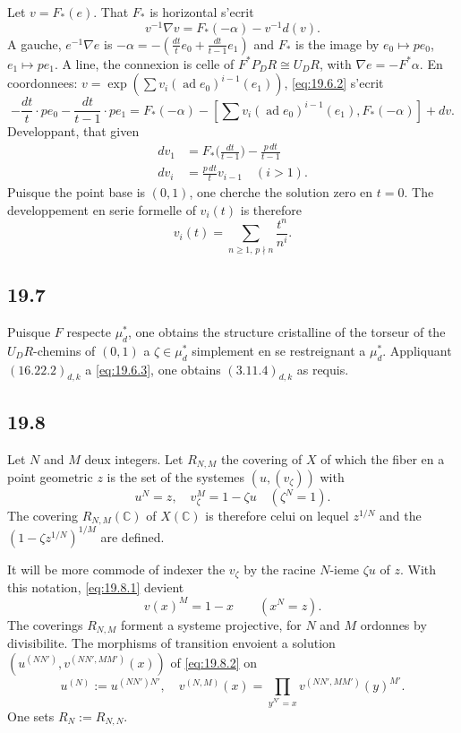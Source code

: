 \documentclass[12pt,a4paper]{article}
\theoremstyle{plain}
\theoremstyle{definition}
\theoremstyle{remark}
\DeclareMathOperator{\ad}{ad}
\newcommand{\dR}{DR}
\newcommand{\CC}{\mathbb{C}}
\begin{document}
Let $v = F_*(e)$. That $F_*$ is horizontal s'ecrit
\begin{equation}\label{eq:19.6.2}
v^{-1} \nabla v = F_*(-\alpha) - v^{-1} d(v).
\end{equation}
A gauche, $e^{-1} \nabla e$ is $-\alpha = -(\frac{dt}{t} e_0 +
\frac{dt}{t-1} e_1)$ and $F_*$ is the image by $e_0 \mapsto p e_0$,
$e_1 \mapsto p e_1$. A line, the connexion is celle of
$F^* P_\dR \cong U_\dR$, with $\nabla e = -F^*\alpha$. En coordonnees:
$v = \exp(\sum v_i (\ad e_0)^{i-1}(e_1))$, \eqref{eq:19.6.2} s'ecrit
\[
-\frac{dt}{t} \cdot p e_0 - \frac{dt}{t-1} \cdot p e_1 = F_*(-\alpha) -
[\sum v_i (\ad e_0)^{i-1}(e_1), F_*(-\alpha)] + dv.
\]
Developpant, that given
\begin{align*}
dv_1 &= F_*\bigl(\frac{dt}{t-1}\bigr) - \frac{p\,dt}{t-1} \\
dv_i &= \frac{p\,dt}{t} v_{i-1} \quad (i > 1).
\end{align*}
Puisque the point base is $(0,1)$, one cherche the solution zero en
$t=0$. The developpement en serie formelle of $v_i(t)$ is therefore
\begin{equation}\label{eq:19.6.3}
v_i(t) = \sum_{n \geq 1,\, p \nmid n} \frac{t^n}{n^i}.
\end{equation}

\subsection{19.7}

Puisque $F$ respecte $\mu_d^*$, one obtains the structure cristalline
of the torseur of the $U_\dR$-chemins of $(0,1)$ a $\zeta \in \mu_d^*$
simplement en se restreignant a $\mu_d^*$. Appliquant
$(16.22.2)_{d,k}$ a \eqref{eq:19.6.3}, one obtains $(3.11.4)_{d,k}$
as requis.

\subsection{19.8}

Let $N$ and $M$ deux integers. Let $R_{N,M}$ the covering of $X$
of which the fiber en a point geometric $z$ is the set of the systemes
$(u, (v_\zeta))$ with
\begin{equation}\label{eq:19.8.1}
u^N = z, \quad v_\zeta^M = 1 - \zeta u \quad (\zeta^N = 1).
\end{equation}
The covering $R_{N,M}(\CC)$ of $X(\CC)$ is therefore celui on lequel
$z^{1/N}$ and the $(1 - \zeta z^{1/N})^{1/M}$ are defined.

It will be more commode of indexer the $v_\zeta$ by the racine $N$-ieme
$\zeta u$ of $z$. With this notation, \eqref{eq:19.8.1} devient
\begin{equation}\label{eq:19.8.2}
v(x)^M = 1 - x \qquad (x^N = z).
\end{equation}
The coverings $R_{N,M}$ forment a systeme projective, for $N$ and
$M$ ordonnes by divisibilite. The morphisms of transition envoient
a solution $(u^{(NN')}, v^{(NN',MM')}(x))$ of \eqref{eq:19.8.2} on
\begin{equation}\label{eq:19.8.3}
u^{(N)} := u^{(NN')N'}, \quad v^{(N,M)}(x) =
\prod_{y^{N'}=x} v^{(NN',MM')}(y)^{M'}.
\end{equation}
One sets $R_N := R_{N,N}$.
\end{document}
